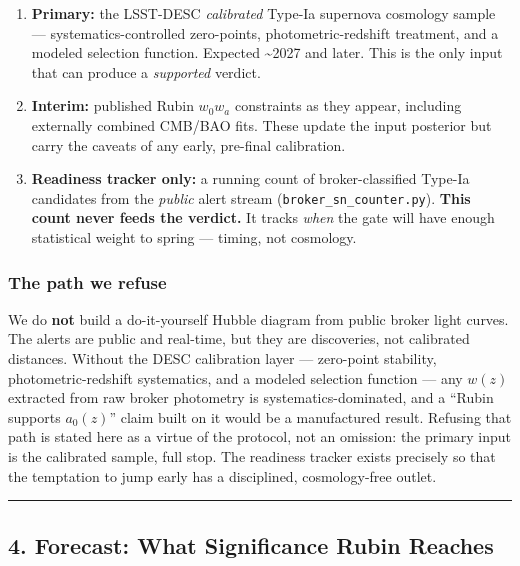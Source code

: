 \documentclass[
]{article}
\providecommand{\tightlist}{%
  \setlength{\itemsep}{0pt}\setlength{\parskip}{0pt}}
\begin{document}
\begin{enumerate}
\def\labelenumi{\arabic{enumi}.}
\tightlist
\item
  \textbf{Primary:} the LSST-DESC \emph{calibrated} Type-Ia supernova
  cosmology sample --- systematics-controlled zero-points,
  photometric-redshift treatment, and a modeled selection function.
  Expected \textasciitilde2027 and later. This is the only input that
  can produce a \emph{supported} verdict.
\item
  \textbf{Interim:} published Rubin \(w_0w_a\) constraints as they
  appear, including externally combined CMB/BAO fits. These update the
  input posterior but carry the caveats of any early, pre-final
  calibration.
\item
  \textbf{Readiness tracker only:} a running count of broker-classified
  Type-Ia candidates from the \emph{public} alert stream
  (\texttt{broker\_sn\_counter.py}). \textbf{This count never feeds the
  verdict.} It tracks \emph{when} the gate will have enough statistical
  weight to spring --- timing, not cosmology.
\end{enumerate}

\subsubsection{The path we refuse}\label{the-path-we-refuse}

We do \textbf{not} build a do-it-yourself Hubble diagram from public
broker light curves. The alerts are public and real-time, but they are
discoveries, not calibrated distances. Without the DESC calibration
layer --- zero-point stability, photometric-redshift systematics, and a
modeled selection function --- any \(w(z)\) extracted from raw broker
photometry is systematics-dominated, and a ``Rubin supports \(a_0(z)\)''
claim built on it would be a manufactured result. Refusing that path is
stated here as a virtue of the protocol, not an omission: the primary
input is the calibrated sample, full stop. The readiness tracker exists
precisely so that the temptation to jump early has a disciplined,
cosmology-free outlet.

\begin{center}\rule{0.5\linewidth}{0.5pt}\end{center}

\subsection{4. Forecast: What Significance Rubin
Reaches}\label{forecast-what-significance-rubin-reaches}
\end{document}

